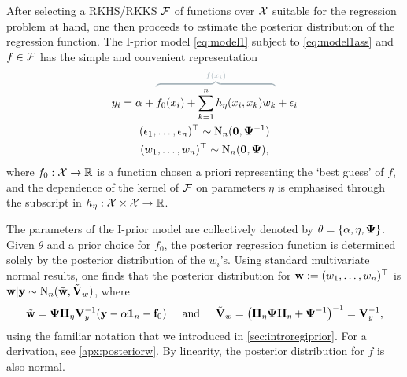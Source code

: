 After selecting a RKHS/RKKS ${\mathcal F}$ of functions over ${\mathcal X}$ suitable for the regression problem at hand, one then proceeds to estimate the posterior distribution of the regression function.
The I-prior model \cref{eq:model1} subject to \cref{eq:model1ass} and $f\in{\mathcal F}$ has the simple and convenient representation
\begin{align}\label{eq:model2}
  \begin{gathered}
    y_i = \alpha + 
    \myoverbrace{f_0(x_i) + \sum_{k=1}^n h_\eta(x_i,x_k)w_k 
    }{f(x_i)}
    + \epsilon_i \\
    (\epsilon_1,\dots,\epsilon_n)^\top \sim \N_n(\bzero, \bPsi^{-1}) \\
    (w_1,\dots,w_n)^\top \sim \N_n(\bzero,\bPsi),
  \end{gathered}
\end{align}
where $f_0:{\mathcal X}\to\mathbb{R}$ is a function chosen a priori representing the `best guess' of $f$, and the dependence of the kernel of ${\mathcal F}$ on parameters $\eta$ is emphasised through the subscript in $h_\eta:{\mathcal X}\times{\mathcal X}\to\mathbb{R}$.

The parameters of the I-prior model are collectively denoted by $\theta = \{\alpha,\eta,{\bm\Psi} \}$.
Given $\theta$ and a prior choice for $f_0$, the posterior regression function is determined solely by the posterior distribution of the $w_i$'s.
Using standard multivariate normal results, one finds that the posterior distribution for ${\mathbf w} := (w_1,\dots,w_n)^\top$ is ${\mathbf w}|{\mathbf y} \sim \operatorname{N}_n(\tilde{\mathbf w}, \tilde{{\mathbf V}}_w )$, where
\begin{align}\label{eq:posteriorw}
  \begin{gathered}
    \tilde{\mathbf w} = {\bm\Psi} {\mathbf H}_\eta {\mathbf V}_y^{-1} ({\mathbf y} - \alpha{\mathbf 1}_n - {\mathbf f}_0)
    \hspace{0.5cm}\text{and}\hspace{0.5cm}
    \tilde{{\mathbf V}}_w = \big({\mathbf H}_\eta{\bm\Psi}{\mathbf H}_\eta + {\bm\Psi}^{-1}\big)^{-1} = {\mathbf V}_y^{-1},
  \end{gathered}
\end{align}
using the familiar notation that we introduced in \cref{sec:introregiprior}.
For a derivation, see \cref{apx:posteriorw}.
By linearity, the posterior distribution for $f$ is also normal.

